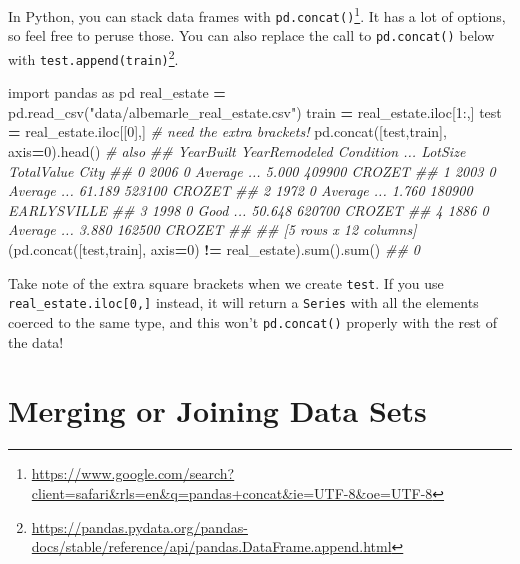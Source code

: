 \documentclass[
  12pt,
  krantz2]{krantz}
\makeatletter
\newenvironment{Shaded}{\begin{snugshade}}{\end{snugshade}}
\newcommand{\BuiltInTok}[1]{#1}
\newcommand{\CommentTok}[1]{\textcolor[rgb]{0.37,0.37,0.37}{\textit{#1}}}
\newcommand{\DecValTok}[1]{\textcolor[rgb]{0.06,0.06,0.06}{#1}}
\newcommand{\ImportTok}[1]{#1}
\newcommand{\NormalTok}[1]{#1}
\newcommand{\OperatorTok}[1]{\textcolor[rgb]{0.43,0.43,0.43}{\textbf{#1}}}
\newcommand{\StringTok}[1]{\textcolor[rgb]{0.5,0.5,0.5}{#1}}
\renewcommand{\href}[2]{#2\footnote{\url{#1}}}
\newenvironment{kframe}{%
\medskip{}
\setlength{\fboxsep}{.8em}
 \def\at@end@of@kframe{}%
 \ifinner\ifhmode%
  \def\at@end@of@kframe{\end{minipage}}%
  \begin{minipage}{\columnwidth}%
 \fi\fi%
 \def\FrameCommand##1{\hskip\@totalleftmargin \hskip-\fboxsep
 \colorbox{shadecolor}{##1}\hskip-\fboxsep
     \hskip-\linewidth \hskip-\@totalleftmargin \hskip\columnwidth}%
 \MakeFramed {\advance\hsize-\width
   \@totalleftmargin\z@ \linewidth\hsize
   \@setminipage}}%
 {\par\unskip\endMakeFramed%
 \at@end@of@kframe}
\renewenvironment{Shaded}{\begin{kframe}}{\end{kframe}}
\makeatother
\begin{document}
In Python, you can stack data frames with \href{https://www.google.com/search?client=safari\&rls=en\&q=pandas+concat\&ie=UTF-8\&oe=UTF-8}{\texttt{pd.concat()}}. It has a lot of options, so feel free to peruse those. You can also replace the call to \texttt{pd.concat()} below with \href{https://pandas.pydata.org/pandas-docs/stable/reference/api/pandas.DataFrame.append.html}{\texttt{test.append(train)}}.

\begin{Shaded}
\begin{Highlighting}[]
\ImportTok{import}\NormalTok{ pandas }\ImportTok{as}\NormalTok{ pd}
\NormalTok{real\_estate }\OperatorTok{=}\NormalTok{ pd.read\_csv(}\StringTok{"data/albemarle\_real\_estate.csv"}\NormalTok{)}
\NormalTok{train }\OperatorTok{=}\NormalTok{ real\_estate.iloc[}\DecValTok{1}\NormalTok{:,]}
\NormalTok{test }\OperatorTok{=}\NormalTok{ real\_estate.iloc[[}\DecValTok{0}\NormalTok{],] }\CommentTok{\# need the extra brackets!}
\NormalTok{pd.concat([test,train], axis}\OperatorTok{=}\DecValTok{0}\NormalTok{).head() }\CommentTok{\# also }
\CommentTok{\#\#    YearBuilt  YearRemodeled Condition  ...  LotSize  TotalValue         City}
\CommentTok{\#\# 0       2006              0   Average  ...    5.000      409900       CROZET}
\CommentTok{\#\# 1       2003              0   Average  ...   61.189      523100       CROZET}
\CommentTok{\#\# 2       1972              0   Average  ...    1.760      180900  EARLYSVILLE}
\CommentTok{\#\# 3       1998              0      Good  ...   50.648      620700       CROZET}
\CommentTok{\#\# 4       1886              0   Average  ...    3.880      162500       CROZET}
\CommentTok{\#\# }
\CommentTok{\#\# [5 rows x 12 columns]}
\NormalTok{(pd.concat([test,train], axis}\OperatorTok{=}\DecValTok{0}\NormalTok{) }\OperatorTok{!=}\NormalTok{ real\_estate).}\BuiltInTok{sum}\NormalTok{().}\BuiltInTok{sum}\NormalTok{()}
\CommentTok{\#\# 0}
\end{Highlighting}
\end{Shaded}

Take note of the extra square brackets when we create \texttt{test}. If you use \texttt{real\_estate.iloc{[}0,{]}} instead, it will return a \texttt{Series} with all the elements coerced to the same type, and this won't \texttt{pd.concat()} properly with the rest of the data!

\hypertarget{merging-or-joining-data-sets}{%
\section{Merging or Joining Data Sets}\label{merging-or-joining-data-sets}}
\end{document}
